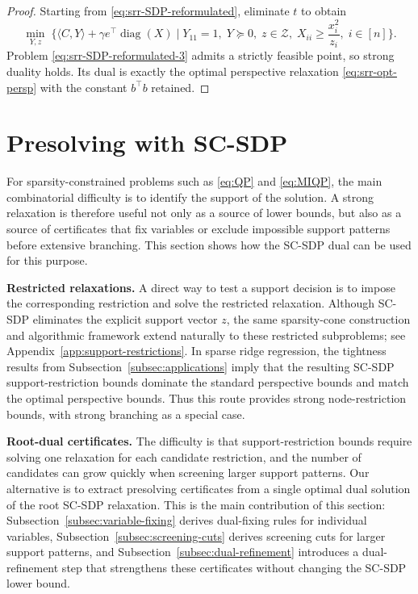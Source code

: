 \documentclass[11pt]{article}
\DeclareMathOperator{\diag}{diag}
\def\tb#1{\textbf{#1}}
\theoremstyle{plain}
\begin{document}
\begin{proof}\;
Starting from \eqref{eq:srr-SDP-reformulated}, eliminate $t$ to obtain
\begin{equation}\label{eq:srr-SDP-reformulated-3}
\min_{Y,z}\;
\Big\{
\langle C,Y\rangle + \gamma e^\top \diag(X)
\;\Big|\;
Y_{11}=1,\;
Y\succeq 0,\;
z\in \mathcal{Z},\; X_{ii}\geq \frac{x_i^2}{z_i},\; i\in [n]
\Big\}.
\end{equation}
Problem \eqref{eq:srr-SDP-reformulated-3} admits a strictly feasible point, so strong duality holds. Its dual is exactly the optimal perspective relaxation \eqref{eq:srr-opt-persp} with the constant \(b^\top b\) retained.
\end{proof}



\section{Presolving with SC-SDP}\label{sec:presolving}

For sparsity-constrained problems such as \eqref{eq:QP} and \eqref{eq:MIQP}, the main combinatorial difficulty is to identify the support of the solution. A strong relaxation is therefore useful not only as a source of lower bounds, but also as a source of certificates that fix variables or exclude impossible support patterns before extensive branching. This section shows how the SC-SDP dual can be used for this purpose.

\medskip
\noindent\tb{Restricted relaxations.}
A direct way to test a support decision is to impose the corresponding restriction and solve the restricted relaxation. Although SC-SDP eliminates the explicit support vector $z$, the same sparsity-cone construction and algorithmic framework extend naturally to these restricted subproblems; see Appendix~\ref{app:support-restrictions}. In sparse ridge regression, the tightness results from Subsection~\ref{subsec:applications} imply that the resulting SC-SDP support-restriction bounds dominate the standard perspective bounds and match the optimal perspective bounds. Thus this route provides strong node-restriction bounds, with strong branching as a special case.

\medskip
\noindent\tb{Root-dual certificates.}
The difficulty is that support-restriction bounds require solving one relaxation for each candidate restriction, and the number of candidates can grow quickly when screening larger support patterns. Our alternative is to extract presolving certificates from a single optimal dual solution of the root SC-SDP relaxation. This is the main contribution of this section: Subsection~\ref{subsec:variable-fixing} derives dual-fixing rules for individual variables, Subsection~\ref{subsec:screening-cuts} derives screening cuts for larger support patterns, and Subsection~\ref{subsec:dual-refinement} introduces a dual-refinement step that strengthens these certificates without changing the SC-SDP lower bound.
\end{document}

